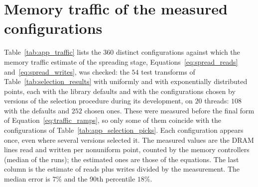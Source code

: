 \section{Memory traffic of the measured configurations}
\label{app:traffic}

Table~\ref{tab:app_traffic} lists the 360 distinct configurations against which the memory traffic estimate of the spreading stage, Equations~\eqref{eq:spread_reads} and~\eqref{eq:spread_writes}, was checked: the $54$ test transforms of Table~\ref{tab:selection_results} with uniformly and with exponentially distributed points, each with the library defaults and with the configurations chosen by versions of the selection procedure during its development, on $20$ threads: $108$ with the defaults and $252$ chosen ones. These were measured before the final form of Equation~\eqref{eq:traffic_ramps}, so only some of them coincide with the configurations of Table~\ref{tab:app_selection_picks}. Each configuration appears once, even where several versions selected it. The measured values are the DRAM lines read and written per nonuniform point, counted by the memory controllers (median of the runs); the estimated ones are those of the equations. The last column is the estimate of reads plus writes divided by the measurement. The median error is $7\%$ and the 90th percentile $18\%$.

